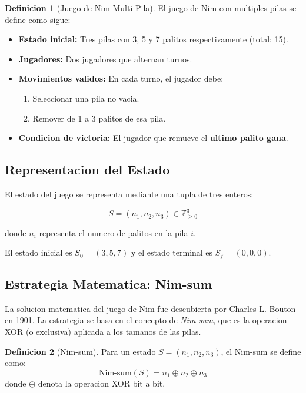 \documentclass[12pt,a4paper]{article}
\theoremstyle{definition}
\newtheorem{definicion}{Definicion}[section]
\begin{document}
\begin{definicion}[Juego de Nim Multi-Pila]
El juego de Nim con multiples pilas se define como sigue:
\begin{itemize}
    \item \textbf{Estado inicial:} Tres pilas con 3, 5 y 7 palitos respectivamente (total: 15).
    \item \textbf{Jugadores:} Dos jugadores que alternan turnos.
    \item \textbf{Movimientos validos:} En cada turno, el jugador debe:
    \begin{enumerate}
        \item Seleccionar una pila no vacia.
        \item Remover de 1 a 3 palitos de esa pila.
    \end{enumerate}
    \item \textbf{Condicion de victoria:} El jugador que remueve el \textbf{ultimo palito gana}.
\end{itemize}
\end{definicion}

\subsection{Representacion del Estado}

El estado del juego se representa mediante una tupla de tres enteros:

\begin{equation}
    S = (n_1, n_2, n_3) \in \mathbb{Z}_{\geq 0}^3
\end{equation}

donde $n_i$ representa el numero de palitos en la pila $i$.

El estado inicial es $S_0 = (3, 5, 7)$ y el estado terminal es $S_f = (0, 0, 0)$.

\subsection{Estrategia Matematica: Nim-sum}

La solucion matematica del juego de Nim fue descubierta por Charles L. Bouton en 1901. La estrategia se basa en el concepto de \textit{Nim-sum}, que es la operacion XOR (o exclusiva) aplicada a los tamanos de las pilas.

\begin{definicion}[Nim-sum]
Para un estado $S = (n_1, n_2, n_3)$, el Nim-sum se define como:
\begin{equation}
    \text{Nim-sum}(S) = n_1 \oplus n_2 \oplus n_3
\end{equation}
donde $\oplus$ denota la operacion XOR bit a bit.
\end{definicion}
\end{document}
